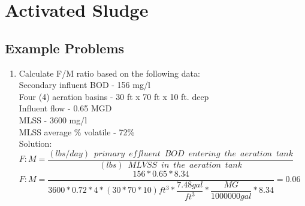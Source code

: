 \documentclass{article}
\begin{document}
\section{Activated Sludge}

\subsection{Example Problems} 

\begin{enumerate}



\item Calculate F/M ratio based on the following data:\\
Secondary influent BOD - 156 mg/l\\
Four (4) aeration basins - 30 ft x 70 ft x 10 ft. deep\\
Influent flow - 0.65 MGD\\
MLSS - 3600 mg/l\\
MLSS average \% volatile - 72\%\\
Solution:\\
\vspace{0.3cm}
$F:M=\dfrac{(lbs/day) \enspace primary \enspace effluent  \enspace BOD \enspace entering \enspace the  \enspace aeration \enspace tank}{(lbs) \enspace MLVSS \enspace in \enspace the  \enspace aeration \enspace tank}$\\
\vspace{0.3cm}
$F:M=\dfrac{156*0.65*8.34}{3600*0.72*4*(30*70*10)ft^3* \dfrac{7.48gal}{ft^3}*\dfrac{MG}{1000000gal}*8.34}=\boxed{0.06}$\\
\pagebreak


\end{enumerate}
\end{document}
